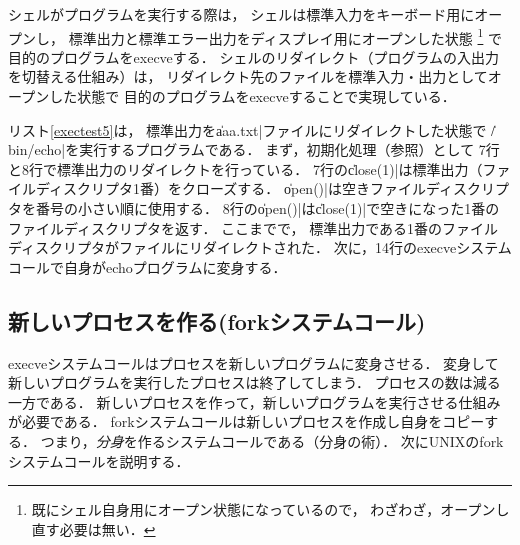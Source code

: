 シェルがプログラムを実行する際は，
シェルは標準入力をキーボード用にオープンし，
標準出力と標準エラー出力をディスプレイ用にオープンした状態
\footnote{
  既にシェル自身用にオープン状態になっているので，
  わざわざ，オープンし直す必要は無い．}
で目的のプログラムをexecveする．
シェルのリダイレクト（プログラムの入出力を切替える仕組み）は，
リダイレクト先のファイルを標準入力・出力としてオープンした状態で
目的のプログラムをexecveすることで実現している．



リスト\ref{exectest5}は，
標準出力を\|aaa.txt|ファイルにリダイレクトした状態で
\|/bin/echo|を実行するプログラムである．
まず，初期化処理（参照）として
7行と8行で標準出力のリダイレクトを行っている．
7行の\|close(1)|は標準出力（ファイルディスクリプタ1番）をクローズする．
\|open()|は空きファイルディスクリプタを番号の小さい順に使用する．
8行の\|open()|は\|close(1)|で空きになった1番のファイルディスクリプタを返す．
ここまでで，
標準出力である1番のファイルディスクリプタがファイルにリダイレクトされた．
次に，14行のexecveシステムコールで自身がechoプログラムに変身する．

\subsection{新しいプロセスを作る(forkシステムコール)}
execveシステムコールはプロセスを新しいプログラムに変身させる．
変身して新しいプログラムを実行したプロセスは終了してしまう．
プロセスの数は減る一方である．
新しいプロセスを作って，新しいプログラムを実行させる仕組みが必要である．
forkシステムコールは新しいプロセスを作成し自身をコピーする．
つまり，\emph{分身}を作るシステムコールである（分身の術）．
次にUNIXのforkシステムコールを説明する．

